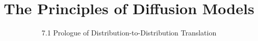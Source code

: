﻿%

\graphicspath{{../images/}}
\title{The Principles of Diffusion Models}
\subtitle{7.1 Prologue of Distribution-to-Distribution Translation}


\begin{frame}
    \titlepage
\end{frame}



